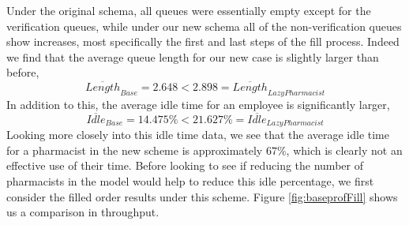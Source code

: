 \documentclass[10pt]{report}            %
\begin{document}
Under the original schema, all queues were essentially empty except for the verification queues, while under our new schema all of the non-verification queues show increases, most specifically the first and last steps of the fill process. Indeed we find that the average queue length for our new case is slightly larger than before,
\[\overline{Length}_{Base}=2.648<2.898=\overline{Length}_{Lazy Pharmacist}\]
In addition to this, the average idle time for an employee is significantly larger,
\[\overline{Idle}_{Base}=14.475\% < 21.627\%=\overline{Idle}_{Lazy Pharmacist}\]
Looking more closely into this idle time data, we see that the average idle time for a pharmacist in the new scheme is approximately $67\%$, which is clearly not an effective use of their time. Before looking to see if reducing the number of pharmacists in the model would help to reduce this idle percentage, we first consider the filled order results under this scheme. Figure \ref{fig:baseprofFill} shows us a comparison in throughput.
\end{document}
